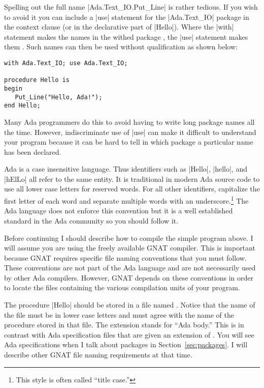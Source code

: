 Spelling out the full name |Ada.Text_IO.Put_Line| is rather tedious. If you wish to avoid it you
can include a |use| statement for the |Ada.Text_IO| package in the context clause (or in the
declarative part of |Hello|). Where the |with| statement makes the names in the withed package
, the |use| statement makes them . Such names can
then be used without qualification as shown below:

\begin{lstlisting}
with Ada.Text_IO; use Ada.Text_IO;

procedure Hello is
begin
   Put_Line("Hello, Ada!");
end Hello;
\end{lstlisting}

\noindent Many Ada programmers do this to avoid having to write long package names all the time.
However, indiscriminate use of |use| can make it difficult to understand your program because it
can be hard to tell in which package a particular name has been declared.

Ada is a case insensitive language. Thus identifiers such as |Hello|, |hello|, and |hElLo| all
refer to the same entity. It is traditional in modern Ada source code to use all lower case
letters for reserved words. For all other identifiers, capitalize the first letter of each word
and separate multiple words with an underscore.\footnote{This style is often called ``title
  case.''} The Ada language does not enforce this convention but it is a well established
standard in the Ada community so you should follow it.

Before continuing I should describe how to compile the simple program above. I will assume you
are using the freely available GNAT compiler. This is important because GNAT requires specific
file naming conventions that you must follow. These conventions are not part of the Ada language
and are not necessarily used by other Ada compilers. However, GNAT depends on these conventions
in order to locate the files containing the various compilation units of your program.

The procedure |Hello| should be stored in a file named . Notice that the
name of the file must be in lower case letters and must agree with the name of the procedure
stored in that file. The  extension stands for ``Ada body.'' This is in contrast
with Ada specification files that are given an extension of . You will see Ada
specifications when I talk about packages in Section~\ref{sec:packages}. I will describe other
GNAT file naming requirements at that time.

